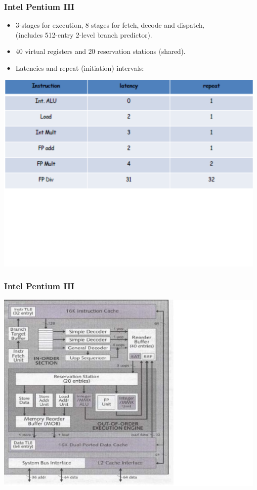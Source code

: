 \documentclass{beamer}
\begin{document}
\begin{frame}[fragile,t]
\frametitle{Intel Pentium III}

\begin{itemize}
\item 3-stages for execution, 8 stages for fetch, decode and dispatch,\\
        (includes 512-entry 2-level branch predictor).
\item 40 virtual registers and 20 reservation stations (shared).
\item Latencies and repeat (initiation) intervals: 
\end{itemize}

\includegraphics[width=70ex]{FigsOoOProc/PentiumLat.pdf}

\end{frame}

\begin{frame}[fragile,t]
\frametitle{Intel Pentium III}

\includegraphics[width=62ex]{FigsOoOProc/Pntium3Arch.pdf}

\end{frame}
\end{document}
